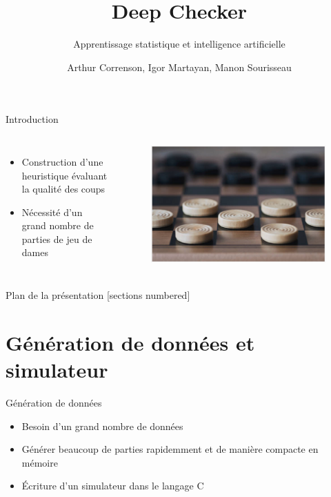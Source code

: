 \documentclass{beamer}
\title{Deep Checker}
\subtitle{Apprentissage statistique et intelligence artificielle}
\date{}
\author{Arthur Correnson, Igor Martayan, Manon Sourisseau}
\institute{Projet de Statistiques, ENS, 2021}
\begin{document}
{\maketitle}

\begin{frame}{Introduction}
    \begin{columns}
        \begin{itemize}
            \item Construction d'une \alert{heuristique} évaluant la qualité des coups
            \item Nécessité d'un grand nombre de parties de jeu de dames
        \end{itemize}
        \begin{figure}
            \centering
            \includegraphics[width=\columnwidth]{im/dames.png}
        \end{figure}
    \end{columns}
\end{frame}

\begin{frame}{Plan de la présentation}
    [sections numbered]
    \tableofcontents
\end{frame}

{\section{Génération de données et simulateur}}

\begin{frame}{Génération de données}
    \begin{itemize}
        \item Besoin d'un \alert{grand nombre de données}
        \item Générer beaucoup de parties \alert{rapidemment} et de manière \alert{compacte} en mémoire
        \item Écriture d'un simulateur dans le langage \alert{C}
    \end{itemize}
\end{frame}
\end{document}
